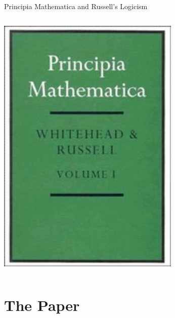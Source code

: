 \documentclass{beamer}
\begin{document}
\begin{frame}{Principia Mathematica and Russell's Logicism}
\begin{columns}[c]
    \includegraphics[height=0.75\textheight]{images/principia.jpg}

  \end{columns}
\end{frame}

\section{The Paper}
\end{document}
